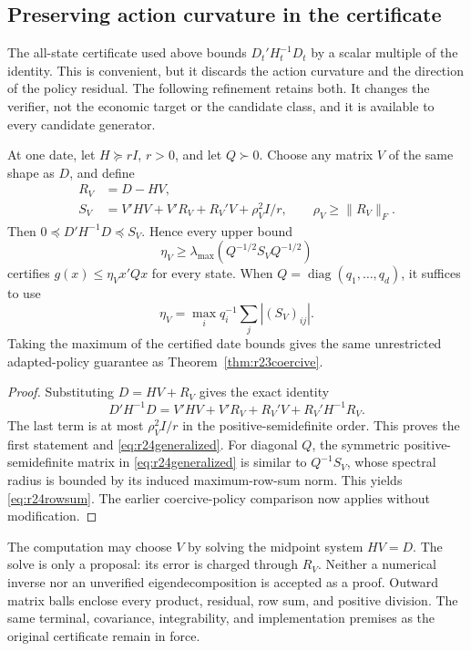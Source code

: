 \subsection{Preserving action curvature in the certificate}\label{sec:r24geometry}
The all-state certificate used above bounds $D_t'H_t^{-1}D_t$ by a scalar
multiple of the identity. This is convenient, but it discards the action
curvature and the direction of the policy residual. The following refinement
retains both. It changes the verifier, not the economic target or the
candidate class, and it is available to every candidate generator.

\begin{proposition}\label{prop:r24energy}
At one date, let $H\succeq rI$, $r>0$, and let $Q\succ0$. Choose any matrix
$V$ of the same shape as $D$, and define
\begin{align}
 R_V&=D-HV,\nonumber\\
 S_V&=V'HV+V'R_V+R_V'V+\rho_V^2 I/r,
 \qquad \rho_V\geq\|R_V\|_F.\label{eq:r24energy}
\end{align}
Then $0\preceq D'H^{-1}D\preceq S_V$. Hence every upper bound
\begin{equation}
 \eta_V\geq\lambda_{\max}(Q^{-1/2}S_VQ^{-1/2})
 \label{eq:r24generalized}
\end{equation}
certifies $g(x)\leq\eta_V x'Qx$ for every state. When
$Q=\operatorname{diag}(q_1,\ldots,q_d)$, it suffices to use
\begin{equation}
 \eta_V=\max_i q_i^{-1}\sum_j |(S_V)_{ij}|.
 \label{eq:r24rowsum}
\end{equation}
Taking the maximum of the certified date bounds gives the same unrestricted
adapted-policy guarantee as Theorem~\ref{thm:r23coercive}.
\end{proposition}
\begin{proof}
Substituting $D=HV+R_V$ gives the exact identity
\[
 D'H^{-1}D=V'HV+V'R_V+R_V'V+R_V'H^{-1}R_V.
\]
The last term is at most $\rho_V^2 I/r$ in the positive-semidefinite order.
This proves the first statement and \eqref{eq:r24generalized}. For diagonal
$Q$, the symmetric positive-semidefinite matrix in
\eqref{eq:r24generalized} is similar to $Q^{-1}S_V$, whose spectral radius
is bounded by its induced maximum-row-sum norm. This yields
\eqref{eq:r24rowsum}. The earlier coercive-policy comparison now applies
without modification.
\end{proof}

The computation may choose $V$ by solving the midpoint system $HV=D$.
The solve is only a proposal: its error is charged through $R_V$.
Neither a numerical inverse nor an unverified eigendecomposition is accepted
as a proof. Outward matrix balls enclose every product, residual, row sum,
and positive division. The same terminal, covariance, integrability, and
implementation premises as the original certificate remain in force.

